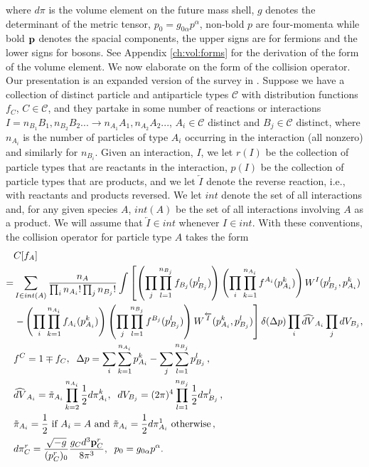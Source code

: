 where $d\pi$ is the volume element on the future mass shell, $g$ denotes the determinant of the metric tensor, $p_0=g_{0\alpha} p^\alpha$, non-bold $p$ are four-momenta while bold ${\bf p}$ denotes the spacial components, the upper signs are for fermions and the lower signs for bosons. See Appendix \ref{ch:vol:forms} for the derivation of the form of the volume element.
We now elaborate on the form of the collision operator.  Our presentation is an expanded version of the survey in \cite{ehlers}.  Suppose we have a collection of  distinct particle and antiparticle types $\mathcal{C}$ with distribution functions $f_{C}$, $C\in\mathcal{C}$, and they partake in some number of reactions or interactions $I=n_{B_1} B_1, n_{B_2}B_2...\longrightarrow n_{A_1} A_1,n_{A_2}A_2...$, $A_i\in\mathcal{C}$ distinct and $B_j\in\mathcal{C}$ distinct, where $n_{A_i}$ is the number of particles of type $A_i$ occurring in the interaction (all nonzero) and similarly for $n_{B_i}$.  Given an interaction, $I$, we let $r(I)$ be the collection of particle types that are reactants in the interaction, $p(I)$ be the collection of particle types that are products, and we let $\overleftarrow{I}$ denote the reverse reaction, i.e., with reactants and products reversed.   We let $int$ denote the set of all interactions and, for any given species $A$, $int(A)$ be the set of all interactions involving $A$ as a   product.   We will assume that $\overleftarrow{I}\in int$ whenever $I\in int$.  With these conventions, the collision operator for particle type $A$ takes the form
\begin{align}\label{collision:operator}
&C[f_A]\\
=&\sum_{I\in int(A)} \frac{n_A}{\prod_i n_{A_i}!\prod _j n_{B_j}!}\int\left[\left(\prod_j \prod_{l=1}^{n_{B_j}}f_{B_j}(p_{B_j}^l)\right)\left(\prod_i \prod_{k=1}^{n_{A_i}}f^{A_i}(p_{A_i}^k)\right)W^I(p_{B_j}^l,p_{A_i}^k) \right.\notag\\
& \left. -\left(\prod_i \prod_{k=1}^{n_{A_i}}f_{A_i}(p_{A_i}^k)\right)\left(\prod_j \prod_{l=1}^{n_{B_j}}f^{B_j}(p_{B_j}^l)\right)W^{\overleftarrow{I}}(p_{A_i}^k,p_{B_j}^l) \right] \delta(\Delta p)\prod_i \widehat{dV}_{A_i}\prod_j dV_{B_j},\notag\\
&f^C=1\mp f_C, \hspace{2mm} \Delta p=\sum_i \sum_{k=1}^{n_{A_i}}p^k_{A_i}-\sum_j \sum_{l=1}^{n_{B_j}}p^l_{B_j}\,,\notag\\
&\widehat{dV}_{A_i}=\tilde{\pi}_{A_i}\prod_{k=2}^{n_{A_i}}\frac{1}{2}d\pi^k_{A_i}, \hspace{2mm}  dV_{B_j}=(2\pi)^4\prod_{l=1}^{n_{B_j}}\frac{1}{2}d\pi^l_{B_j}\,,\notag\\
&\tilde{\pi}_{A_i}=\frac{1}{2} \text{ if } A_i=A \text{ and }  \tilde{\pi}_{A_i}=\frac{1}{2}d\pi^1_{A_i} \text{ otherwise\,,} \notag\\
&d\pi_{C}^r=\frac{\sqrt{-g}}{(p_{C}^r)_0}\frac{g_{C}d^3{\bf p}_{C}^r}{8\pi^3}, \hspace{2mm}p_0=g_{0\alpha}p^\alpha.\notag
\end{align}
